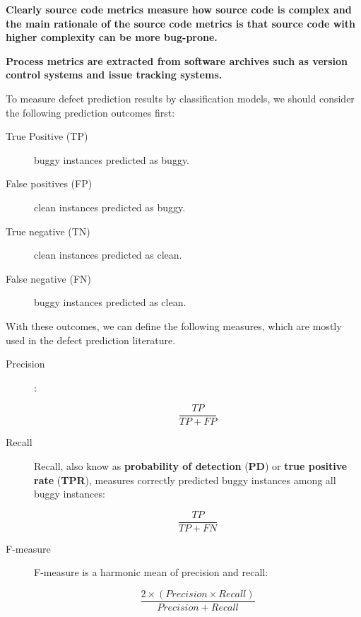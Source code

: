 \documentclass[10pt,a4paper]{article}
\begin{document}
\textbf{Clearly source code metrics measure how source code is complex and the main rationale of the source code metrics is that source code with higher
complexity can be more bug-prone.} 

\textbf{Process metrics are extracted from software archives such as version control systems and issue tracking systems.}

To measure defect prediction results by classification models, we should consider the following prediction outcomes first:

\begin{description}

\item[True Positive (TP)] buggy instances predicted as buggy.
\item[False positives (FP)] clean instances predicted as buggy.
\item[True negative (TN)] clean instances predicted as clean.
\item[False negative (FN)] buggy instances predicted as clean.

\end{description}

With these outcomes, we can define the following measures, which are mostly used in the defect prediction literature.

\begin{description}

\item[Precision]:

\begin{equation}
\dfrac{TP}{TP + FP}
\end{equation}

\item[Recall] Recall, also know as \textbf{probability of detection} (\textbf{PD}) or \textbf{true positive rate} (\textbf{TPR}), measures correctly predicted buggy instances among all buggy instances:

\begin{equation}
\dfrac{TP}{TP + FN}
\end{equation}

\item[F-measure] F-measure is a harmonic mean of precision and recall:

\begin{equation}
\dfrac{2 \times (Precision \times Recall)}{Precision + Recall}
\end{equation}


\end{description}
\end{document}
